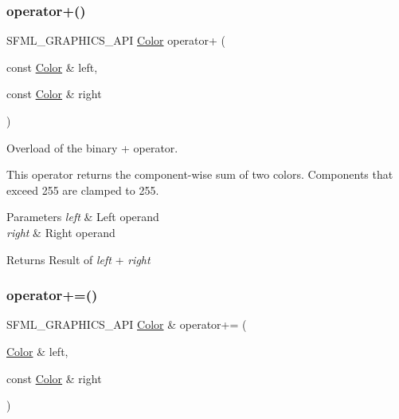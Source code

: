\subsubsection{\texorpdfstring{operator+()}{operator+()}}
{\footnotesize\ttfamily S\+F\+M\+L\+\_\+\+G\+R\+A\+P\+H\+I\+C\+S\+\_\+\+A\+PI \hyperlink{classsf_1_1_color}{Color} operator+ (\begin{DoxyParamCaption}\item[{const \hyperlink{classsf_1_1_color}{Color} \&}]{left,  }\item[{const \hyperlink{classsf_1_1_color}{Color} \&}]{right }\end{DoxyParamCaption})\hspace{0.3cm}{\ttfamily [related]}}



Overload of the binary + operator. 

This operator returns the component-\/wise sum of two colors. Components that exceed 255 are clamped to 255.


\begin{DoxyParams}{Parameters}
{\em left} & Left operand \\
\hline
{\em right} & Right operand\\
\hline
\end{DoxyParams}
\begin{DoxyReturn}{Returns}
Result of {\itshape left} + {\itshape right} 
\end{DoxyReturn}
\mbox{\label{classsf_1_1_color_a19917f2453a4acfd69de2539bfab8031}} 
\subsubsection{\texorpdfstring{operator+=()}{operator+=()}}
{\footnotesize\ttfamily S\+F\+M\+L\+\_\+\+G\+R\+A\+P\+H\+I\+C\+S\+\_\+\+A\+PI \hyperlink{classsf_1_1_color}{Color} \& operator+= (\begin{DoxyParamCaption}\item[{\hyperlink{classsf_1_1_color}{Color} \&}]{left,  }\item[{const \hyperlink{classsf_1_1_color}{Color} \&}]{right }\end{DoxyParamCaption})\hspace{0.3cm}{\ttfamily [related]}}



